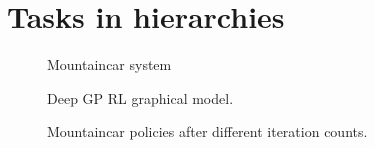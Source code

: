 \section{Tasks in hierarchies}
\begin{figure}[t]
    \centering
    
    \caption{
        \label{fig:discussion:mountaincar_system}
        Mountaincar system
    }
\end{figure}
\begin{figure}[t]
    \centering
    
    \caption{
        \label{fig:discussion:rl_as_deep_gp}
        Deep GP RL graphical model.
    }
\end{figure}
\begin{figure}[tp]
    \centering
    
    
    
    \caption{
        \label{fig:discussion:mountaincar_policy}
        Mountaincar policies after different iteration counts.
    }
\end{figure}
